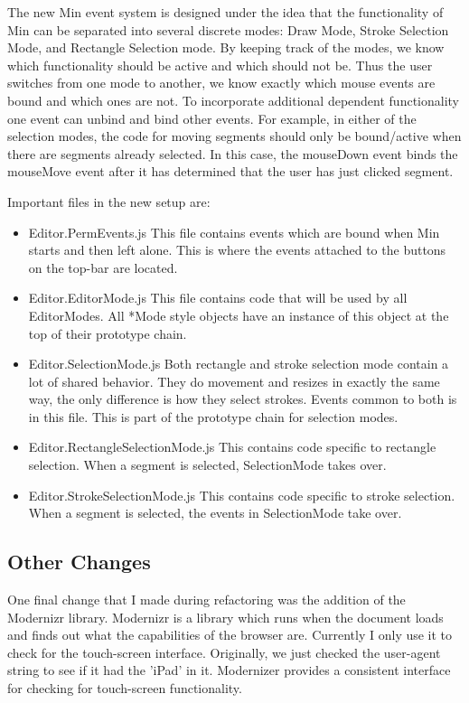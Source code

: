\documentclass[letterpaper]{article}
\begin{document}
The new Min event system is designed under the idea that the functionality of
Min can be separated into several discrete modes: Draw Mode, Stroke Selection
Mode, and Rectangle Selection mode. By keeping track of the modes, we know which
functionality should be active and which should not be. Thus the user switches
from one mode to another, we know exactly which mouse events are bound and which
ones are not. To incorporate additional dependent functionality one event can
unbind and bind other events. For example, in either of the selection modes, the
code for moving segments should only be bound/active when there are segments
already selected. In this case, the mouseDown event binds the mouseMove event
after it has determined that the user has just clicked segment. 

Important files in the new setup are:
\begin{itemize}
    \item Editor.PermEvents.js This file contains events which are bound when
        Min starts and then left alone. This is where the events attached to the
        buttons on the top-bar are located.
    \item Editor.EditorMode.js This file contains code that will be used by
        all EditorModes. All *Mode style objects have an instance of this object
        at the top of their prototype chain.
    \item Editor.SelectionMode.js Both rectangle and stroke selection mode
        contain a lot of shared behavior. They do movement and resizes in
        exactly the same way, the only difference is how they select strokes.
        Events common to both is in this file. This is part of the prototype
        chain for selection modes.
    \item Editor.RectangleSelectionMode.js This contains code specific to
        rectangle selection. When a segment is selected, SelectionMode takes
        over.
    \item Editor.StrokeSelectionMode.js This contains code specific to stroke
        selection. When a segment is selected, the events in SelectionMode take
        over.
\end{itemize}

\subsection*{Other Changes}

One final change that I made during refactoring was the addition of the
Modernizr library. Modernizr is a library which runs when the document loads and
finds out what the capabilities of the browser are. Currently I only use it to
check for the touch-screen interface. Originally, we just checked the user-agent
string to see if it had the 'iPad' in it. Modernizer provides a consistent
interface for checking for touch-screen functionality.
\end{document}

